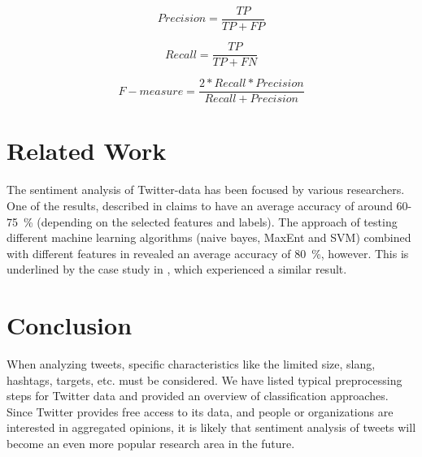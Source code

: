 \documentclass{acm_proc_article-sp}
\begin{document}
\begin{equation}
Precision = \frac{TP}{TP+FP}
\end{equation}

\begin{equation}
Recall = \frac{TP}{TP+FN}
\end{equation}

\begin{equation}
F-measure = \frac{2*Recall*Precision}{Recall+Precision}
\end{equation}


\section{Related Work} \label{related}
The sentiment analysis of Twitter-data has been focused by various researchers. One of the results, described in \cite{agarwal2011sentiment} claims to have an average accuracy of around 60-75~\% (depending on the selected features and labels). 
The approach of testing different machine learning algorithms (naive bayes, MaxEnt and SVM) combined with different features in \cite{go2009twitter} revealed an average accuracy of 80~\%, however. This is underlined by the case study in \cite{lin2012large}, which experienced a similar result.

\section{Conclusion} \label{conclusion}
When analyzing tweets, specific characteristics like the limited size, slang, hashtags, targets, etc. must be considered. We have listed typical preprocessing steps for Twitter data and provided an overview of classification approaches. 
Since Twitter provides free access to its data, and people or organizations are interested in aggregated opinions, it is likely that sentiment analysis of tweets will become an even more popular research area in the future.



%

%
%
\end{document}
